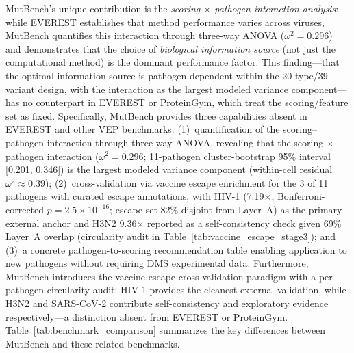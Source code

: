 MutBench's unique contribution is the \textit{scoring $\times$ pathogen interaction analysis}: while EVEREST establishes that method performance varies across viruses, MutBench quantifies this interaction through three-way ANOVA ($\omega^2 = 0.296$) and demonstrates that the choice of \textit{biological information source} (not just the computational method) is the dominant performance factor. This finding---that the optimal information source is pathogen-dependent within the 20-type/39-variant design, with the interaction as the largest modeled variance component---has no counterpart in EVEREST or ProteinGym, which treat the scoring/feature set as fixed.
Specifically, MutBench provides three capabilities absent in EVEREST and other VEP benchmarks:
(1)~quantification of the scoring--pathogen interaction through three-way ANOVA, revealing that the scoring $\times$ pathogen interaction ($\omega^2 = 0.296$; 11-pathogen cluster-bootstrap 95\% interval [0.201, 0.346]) is the largest modeled variance component (within-cell residual $\omega^2 \approx 0.39$);
(2)~cross-validation via vaccine escape enrichment for the 3 of 11 pathogens with curated escape annotations, with HIV-1 (7.19$\times$, Bonferroni-corrected $p = 2.5 \times 10^{-16}$; escape set 82\% disjoint from Layer~A) as the primary external anchor and H3N2 9.36$\times$ reported as a self-consistency check given 69\% Layer~A overlap (circularity audit in Table~\ref{tab:vaccine_escape_stage3});
and (3)~a concrete pathogen-to-scoring recommendation table enabling application to new pathogens without requiring DMS experimental data.
Furthermore, MutBench introduces the vaccine escape cross-validation paradigm with a per-pathogen circularity audit: HIV-1 provides the cleanest external validation, while H3N2 and SARS-CoV-2 contribute self-consistency and exploratory evidence respectively---a distinction absent from EVEREST or ProteinGym.
Table~\ref{tab:benchmark_comparison} summarizes the key differences between MutBench and these related benchmarks.

